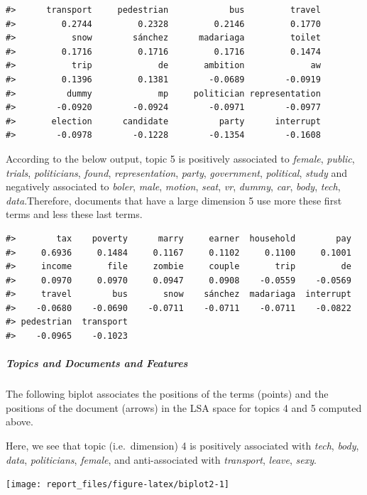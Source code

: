 \documentclass[
]{article}
\begin{document}
\begin{verbatim}
#>      transport     pedestrian            bus         travel 
#>         0.2744         0.2328         0.2146         0.1770 
#>           snow        sánchez      madariaga         toilet 
#>         0.1716         0.1716         0.1716         0.1474 
#>           trip             de       ambition             aw 
#>         0.1396         0.1381        -0.0689        -0.0919 
#>          dummy             mp     politician representation 
#>        -0.0920        -0.0924        -0.0971        -0.0977 
#>       election      candidate          party      interrupt 
#>        -0.0978        -0.1228        -0.1354        -0.1608
\end{verbatim}

According to the below output, topic 5 is positively associated to
\emph{female}, \emph{public}, \emph{trials}, \emph{politicians},
\emph{found}, \emph{representation}, \emph{party}, \emph{government},
\emph{political}, \emph{study} and negatively associated to
\emph{boler}, \emph{male}, \emph{motion}, \emph{seat}, \emph{vr},
\emph{dummy}, \emph{car}, \emph{body}, \emph{tech},
\emph{data}.Therefore, documents that have a large dimension 5 use more
these first terms and less these last terms.

\begin{verbatim}
#>        tax    poverty      marry     earner  household        pay 
#>     0.6936     0.1484     0.1167     0.1102     0.1100     0.1001 
#>     income       file     zombie     couple       trip         de 
#>     0.0970     0.0970     0.0947     0.0908    -0.0559    -0.0569 
#>     travel        bus       snow    sánchez  madariaga  interrupt 
#>    -0.0680    -0.0690    -0.0711    -0.0711    -0.0711    -0.0822 
#> pedestrian  transport 
#>    -0.0965    -0.1023
\end{verbatim}

\hypertarget{topics-and-documents-and-features}{%
\subparagraph{Topics and Documents and
Features}\label{topics-and-documents-and-features}}

The following biplot associates the positions of the terms (points) and
the positions of the document (arrows) in the LSA space for topics 4 and
5 computed above.

Here, we see that topic (i.e.~dimension) 4 is positively associated with
\emph{tech}, \emph{body}, \emph{data}, \emph{politicians},
\emph{female}, and anti-associated with \emph{transport}, \emph{leave},
\emph{sexy}.

\begin{center}\texttt{[image: report\_files/figure-latex/biplot2-1]} \end{center}
\end{document}
